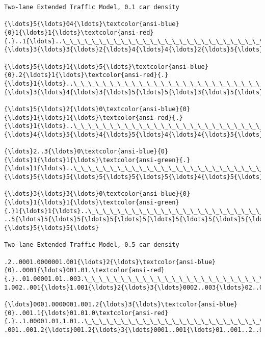 \documentclass[11pt]{article}
\begin{document}
    \begin{Verbatim}[commandchars=\\\{\},fontsize=\footnotesize]
Two-lane Extended Traffic Model, 0.1 car density

{\ldots}5{\ldots}04{\ldots}\textcolor{ansi-blue}{0}1{\ldots}1{\ldots}\textcolor{ansi-red}{.}..1{\ldots}..\_\_\_\_\_\_\_\_\_\_\_\_\_\_\_\_\_\_\_\_\_\_\_\_\_\_\_\_\_\_
{\ldots}3{\ldots}3{\ldots}2{\ldots}4{\ldots}4{\ldots}2{\ldots}5{\ldots}02..2..3{\ldots}5{\ldots}

{\ldots}5{\ldots}1{\ldots}5{\ldots}\textcolor{ansi-blue}{0}.2{\ldots}1{\ldots}\textcolor{ansi-red}{.}{\ldots}1{\ldots}..\_\_\_\_\_\_\_\_\_\_\_\_\_\_\_\_\_\_\_\_\_\_\_\_\_\_\_\_\_\_
{\ldots}3{\ldots}4{\ldots}3{\ldots}5{\ldots}5{\ldots}3{\ldots}5{\ldots}1..2..3...4{\ldots}5{\ldots}

{\ldots}5{\ldots}2{\ldots}0\textcolor{ansi-blue}{0}{\ldots}1{\ldots}1{\ldots}\textcolor{ansi-red}{.}{\ldots}1{\ldots}..\_\_\_\_\_\_\_\_\_\_\_\_\_\_\_\_\_\_\_\_\_\_\_\_\_\_\_\_\_\_
{\ldots}4{\ldots}5{\ldots}4{\ldots}5{\ldots}4{\ldots}4{\ldots}5{\ldots}2{\ldots}3...4{\ldots}5{\ldots}5

{\ldots}2..3{\ldots}0\textcolor{ansi-blue}{0}{\ldots}1{\ldots}1{\ldots}\textcolor{ansi-green}{.}{\ldots}1{\ldots}..\_\_\_\_\_\_\_\_\_\_\_\_\_\_\_\_\_\_\_\_\_\_\_\_\_\_\_\_\_\_
{\ldots}5{\ldots}5{\ldots}5{\ldots}5{\ldots}5{\ldots}4{\ldots}5{\ldots}3{\ldots}3{\ldots}4{\ldots}5{\ldots}5..

{\ldots}3{\ldots}3{\ldots}0\textcolor{ansi-blue}{0}{\ldots}1{\ldots}1{\ldots}\textcolor{ansi-green}{.}1{\ldots}1{\ldots}..\_\_\_\_\_\_\_\_\_\_\_\_\_\_\_\_\_\_\_\_\_\_\_\_\_\_\_\_\_\_
..5{\ldots}5{\ldots}5{\ldots}5{\ldots}5{\ldots}5{\ldots}5{\ldots}5{\ldots}3{\ldots}4.{\ldots}5{\ldots}5{\ldots}

Two-lane Extended Traffic Model, 0.5 car density

.2..0001.0000001.001{\ldots}2{\ldots}\textcolor{ansi-blue}{0}..0001{\ldots}001.01.\textcolor{ansi-red}{.}..01.00001.01..003.\_\_\_\_\_\_\_\_\_\_\_\_\_\_\_\_\_\_\_\_\_\_\_\_\_\_\_\_\_\_
1.002..001{\ldots}1.001{\ldots}2{\ldots}3{\ldots}0002..003{\ldots}02..002..2..000002..00001.1.3{\ldots}1.1.004{\ldots}01{\ldots}

{\ldots}0001.0000001.001.2{\ldots}3{\ldots}\textcolor{ansi-blue}{0}..001.1{\ldots}01.01.0\textcolor{ansi-red}{.}..1.00001.01.1.01..\_\_\_\_\_\_\_\_\_\_\_\_\_\_\_\_\_\_\_\_\_\_\_\_\_\_\_\_\_\_
.001..001.2{\ldots}001.2{\ldots}3{\ldots}0001..001{\ldots}01..001..2..000001..00001.1.2{\ldots}1.1.001{\ldots}2..1.2..


\end{Verbatim}
\end{document}
